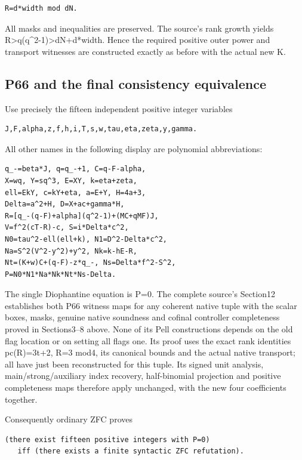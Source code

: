 \begin{Verbatim}[fontsize=\small,breaklines=true,breakanywhere=true,breaksymbolleft={}]
R=d*width mod dN.
\end{Verbatim}

All masks and inequalities are preserved. The source's rank growth yields R>q(q\textasciicircum{}2-1)>dN+d*width. Hence the required positive outer power and transport witnesses are constructed exactly as before with the actual new K.

\subsection{P66 and the final consistency equivalence}
Use precisely the fifteen independent positive integer variables

\begin{Verbatim}[fontsize=\small,breaklines=true,breakanywhere=true,breaksymbolleft={}]
J,F,alpha,z,f,h,i,T,s,w,tau,eta,zeta,y,gamma.
\end{Verbatim}

All other names in the following display are polynomial abbreviations:

\begin{Verbatim}[fontsize=\small,breaklines=true,breakanywhere=true,breaksymbolleft={}]
q_-=beta*J, q=q_-+1, C=q-F-alpha,
X=wq, Y=sq^3, E=XY, k=eta+zeta,
ell=EkY, c=kY+eta, a=E+Y, H=4a+3,
Delta=a^2+H, D=X+ac+gamma*H,
R=[q_-(q-F)+alpha](q^2-1)+(MC+qMF)J,
V=f^2(cT-R)-c, S=i*Delta*c^2,
N0=tau^2-ell(ell+k), N1=D^2-Delta*c^2,
Na=S^2(V^2-y^2)+y^2, Nk=k-hE-R,
Nt=(K+w)C+(q-F)-z*q_-, Ns=Delta*f^2-S^2,
P=N0*N1*Na*Nk*Nt*Ns-Delta.
\end{Verbatim}

The single Diophantine equation is P=0. The complete source's Section12 establishes both P66 witness maps for any coherent native tuple with the scalar boxes, masks, genuine native soundness and cofinal controller completeness proved in Sections3--8 above. None of its Pell constructions depends on the old flag location or on setting all flags one. Its proof uses the exact rank identities pc(R)=3t+2, R=3 mod4, its canonical bounds and the actual native transport; all have just been reconstructed for this tuple. Its signed unit analysis, main/strong/auxiliary index recovery, half-binomial projection and positive completeness maps therefore apply unchanged, with the new four coefficients together.

Consequently ordinary ZFC proves

\begin{Verbatim}[fontsize=\small,breaklines=true,breakanywhere=true,breaksymbolleft={}]
(there exist fifteen positive integers with P=0)
   iff (there exists a finite syntactic ZFC refutation).
\end{Verbatim}

